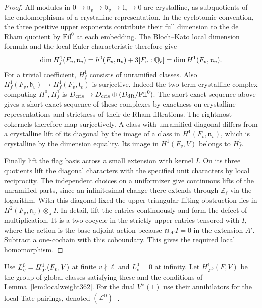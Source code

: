 \documentclass[a4paper,11pt]{article}
\theoremstyle{definition}
\theoremstyle{remark}
\newcommand{\ZZ}{\mathbb Z}\newcommand{\ord}{\operatorname{ord}}
\numberwithin{equation}{section}
\begin{document}
\begin{proof}
All modules in
\(0\to\mathfrak n_v\to\mathfrak b_v\to\mathfrak t_v\to0\)
are crystalline, as subquotients of the endomorphisms of a
crystalline representation. In the cyclotomic convention,
the three positive upper exponents contribute their full
dimension to the de Rham quotient by \(\mathrm{Fil}^0\) at
each embedding. The Bloch--Kato local dimension formula and
the local Euler characteristic therefore give
\[
 \dim H^1_f(F_v,\mathfrak n_v)
   =h^0(F_v,\mathfrak n_v)+3[F_v:\mathbb Q_\ell]
   =\dim H^1(F_v,\mathfrak n_v).
\]
For a trivial coefficient, \(H^1_f\) consists of unramified
classes. Also \(H^1_f(F_v,\mathfrak b_v)\to
H^1_f(F_v,\mathfrak t_v)\) is surjective. Indeed the
two-term crystalline complex computing \(H^0,H^1_f\) is
\(D_{\rm cris}\to D_{\rm cris}\oplus(D_{\rm dR}/\mathrm{Fil}^0)\).
The short exact sequence above gives a short exact sequence of
these complexes by exactness on crystalline representations
and strictness of their de Rham filtrations. The rightmost
cokernels therefore map surjectively. A class with unramified
diagonal differs from a crystalline lift of its diagonal by
the image of a class in \(H^1(F_v,\mathfrak n_v)\), which is
crystalline by the dimension equality. Its image in
\(H^1(F_v,V)\) belongs to \(H^1_f\).~\cite{VII-V-VI-bk117}

Finally lift the flag basis across a small extension with
kernel \(I\). On its three quotients lift the diagonal
characters with the specified unit characters by local
reciprocity. The independent choices on a uniformizer give
continuous lifts of the unramified parts, since an infinitesimal
change there extends through \(\ZZ_\ell\) via the logarithm.
With this diagonal fixed the upper triangular lifting
obstruction lies in \(H^2(F_v,\mathfrak n_v)\otimes_J I\).
In detail, lift the entries continuously and form the defect of
multiplication. It is a two-cocycle in the strictly upper
entries tensored with \(I\), where the action is the base
adjoint action because \(\mathfrak m_{A'} I=0\) in the
extension \(A'\). Subtract a one-cochain with this coboundary.
This gives the required local homomorphism.
\end{proof}

Use \(L_v^0=H^1_{\rm ur}(F_v,V)\) at finite \(v\nmid\ell\)
and \(L_v^0=0\) at infinity. Let \(H^1_{\mathcal L^0}(F,V)\)
be the group of global classes satisfying these and the
conditions of Lemma~\ref{lem:localweight362}. For the dual
\(V^\vee(1)\) use their annihilators for the local Tate pairings,
denoted \((\mathcal L^0)^\perp\).
\end{document}
